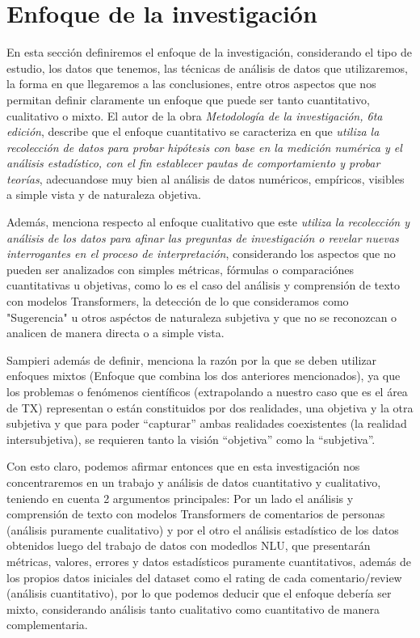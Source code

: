 \chapter{Enfoque de la investigación}
\label{cha:enfoque_investigacion}

En esta sección definiremos el enfoque de la investigación, considerando el tipo de estudio, los datos que tenemos, las técnicas de análisis de datos que utilizaremos, la forma en que llegaremos a las conclusiones, entre otros aspectos que nos permitan definir claramente un enfoque que puede ser tanto cuantitativo, cualitativo o mixto.
El autor de la obra \textit{Metodología de la investigación, 6ta edición}\cite{sampieri2014metodología}, describe que el enfoque cuantitativo se caracteriza en que \textit{utiliza la recolección de datos para probar hipótesis con base en la medición numérica y el análisis estadístico, con el fin establecer pautas de comportamiento y probar teorías}, adecuandose muy bien al análisis de datos numéricos, empíricos, visibles a simple vista y de naturaleza objetiva.

Además, menciona respecto al enfoque cualitativo que este \textit{utiliza la recolección y  análisis de los datos para afinar las preguntas de investigación o revelar nuevas interrogantes en el proceso de interpretación}\cite{sampieri2014metodología}, considerando los aspectos que no pueden ser analizados con simples métricas, fórmulas o comparaciónes cuantitativas u objetivas, como lo es el caso del análisis y comprensión de texto con modelos Transformers, la detección de lo que consideramos como "Sugerencia" u otros aspéctos de naturaleza subjetiva y que no se reconozcan o analicen de manera directa o a simple vista.

Sampieri además de definir, menciona la razón por la que se deben utilizar enfoques mixtos (Enfoque que combina los dos anteriores mencionados), ya que los problemas o fenómenos científicos (extrapolando a nuestro caso que es el área de TX) representan o están constituidos por dos realidades, una objetiva y la otra subjetiva y que para poder “capturar” ambas realidades coexistentes (la realidad intersubjetiva), se requieren tanto la visión “objetiva” como la “subjetiva”\cite{sampieri2014metodología}.

Con esto claro, podemos afirmar entonces que en esta investigación nos concentraremos en un trabajo y análisis de datos cuantitativo y cualitativo, teniendo en cuenta 2 argumentos principales: Por un lado el análisis y comprensión de texto con modelos Transformers de comentarios de personas (análisis puramente cualitativo) y por el otro el análisis estadístico de los datos obtenidos luego del trabajo de datos con modedlos NLU, que presentarán métricas, valores, errores y datos estadísticos puramente cuantitativos, además de los propios datos iniciales del dataset como el rating de cada comentario/review (análisis cuantitativo), por lo que podemos deducir que el enfoque debería ser mixto, considerando análisis tanto cualitativo como cuantitativo de manera complementaria.


